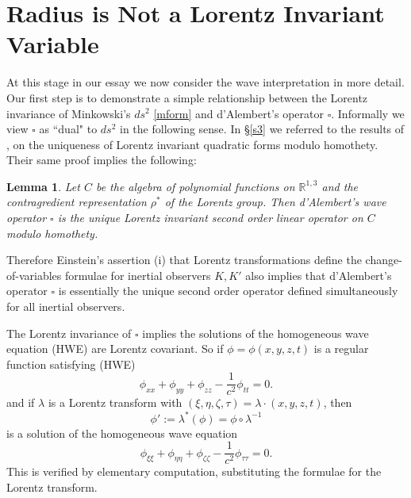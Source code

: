 \documentclass[12pt]{amsart}
\newtheorem*{lem}{Lemma}
\newcommand{\bR}{\mathbb{R}}
\begin{document}
\section{Radius is Not a Lorentz Invariant Variable}\label{wes}

At this stage in our essay we now consider the wave interpretation in more detail. Our first step is to demonstrate a simple relationship between the Lorentz invariance of Minkowski's $ds^2$ \eqref{mform} and d'Alembert's operator $\square$. Informally we view $\square$ as ``dual" to $ds^2$ in the following sense. In \S\ref{s3} we referred to the results of \cite{elton2010indefinite}, \cite{arminjon2018lorentz} on the uniqueness of Lorentz invariant quadratic forms modulo homothety. Their same proof implies the following:

\begin{lem}
Let $C$ be the algebra of polynomial functions on $\bR^{1,3}$ and the contragredient representation $\rho^*$ of the Lorentz group. Then d'Alembert's wave operator $\square$ is the unique Lorentz invariant second order linear operator on $C$ modulo homothety.
\end{lem}

Therefore Einstein's assertion (i) that Lorentz transformations define the change-of-variables formulae for inertial observers $K, K'$ also implies that d'Alembert's operator $\square$ is essentially the unique second order operator defined simultaneously for all inertial observers. 

The Lorentz invariance of $\square$ implies the solutions of the homogeneous wave equation (HWE) are Lorentz covariant. So if $\phi=\phi(x,y,z,t)$ is a regular function satisfying (HWE)
\begin{equation} \label{hw}
\phi_{xx}+\phi_{yy}+\phi_{zz}-\frac{1}{c^2}\phi_{tt}=0.
\end{equation} and if $\lambda$ is a Lorentz transform with $(\xi, \eta, \zeta, \tau)=\lambda \cdot (x,y,z,t)$, then $$\phi':=\lambda^*(\phi)=\phi\circ\lambda^{-1}$$ is a solution of the homogeneous wave equation $$\phi_{\xi \xi}+\phi_{\eta \eta}+\phi_{\zeta \zeta}-\frac{1}{c^2}\phi_{\tau \tau}=0.$$ This is verified by elementary computation, substituting the formulae for the Lorentz transform. 
\end{document}
